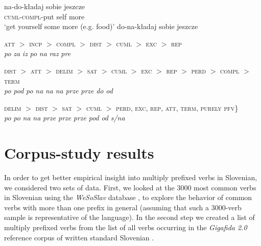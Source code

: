 \documentclass[output=paper,colorlinks,citecolor=brown]{langscibook}
\begin{document}
\ea \label{ex:wilandDoNaDo}
\ea \gll na-do-kładaj sobie jeszcze \\ 
\textsc{cuml}-\textsc{compl}-put self more\\ 
\glt ‘get yourself some more (e.g. food)’ \label{ex:wilandNaDo}
\ex *do-na-kładaj sobie jeszcze \label{ex:wilandDoNa} \hfill \citep[Polish;][]{wiland2012prefix}
\z \z 

\ea \gll \textsc{att} $>$ \textsc{incp} $>$ \textsc{compl} $>$ \textsc{dist} $>$ \textsc{cuml} $>$ \textsc{exc} $>$ \textsc{rep} \label{ex:istrakovaOrder} \\
\textit{po}  {} \textit{za} {} \textit{iz} {} \textit{po} {} \textit{na} {} \textit{raz} {} \textit{pre}\\
\glt \strut \hfill \citep[Bulgarian;][]{istratkova2006}
\z

 \ea 
\gll \textsc{dist} $>$ \textsc{att} $>$ \textsc{delim} $>$ \textsc{sat} $>$ \textsc{cuml} $>$ \textsc{exc} $>$ \textsc{rep} $>$ \textsc{perd} $>$ \textsc{compl} $>$ \textsc{term} \\
\textit{po}  {} \textit{pod} {} \textit{po} {} \textit{na} {} \textit{na} {} \textit{na} {} \textit{prze} {} \textit{prze} {} \textit{do} {} \textit{od} \\
\glt \strut \label{ex:wilandOrder} \hfill \citep[Polish;][]{wiland2012prefix}
 \z
 
\ea \gll \textsc{delim} $>$ \textsc{dist} $>$ \textsc{sat} $>$ \textsc{cuml} $>$ \minsp{\{} \textsc{perd}, \textsc{exc}, \textsc{rep}, \textsc{att}, \textsc{term}, \textsc{purely pfv}\}\\
\textit{po}  {} \textit{po} {} \textit{na} {} \textit{na} {} {} \textit{prze} \textit{prze} \textit{prze} \textit{pod} \textit{od} \textit{s/na} \\
\label{ex:klimekOrder} \hfill \citep[Polish;][]{KlimekJankowskaBlaszczak2022}
\z




\section{Corpus-study results}\label{sec:corpus}

In order to get better empirical insight into multiply prefixed verbs in Slovenian, we considered two sets of data. First, we looked at the 3000 most common verbs in Slovenian using the \textit{WeSoSlav} database \citep[see][]{mar+:WeSoSlaV}, to explore the behavior of common verbs with more than one prefix in general (assuming that such a 3000-verb sample is representative of the language). In the second step we created a list of multiply prefixed verbs from the list of all verbs occurring in the \textit{Gigafida 2.0} reference corpus of written standard Slovenian \citep{gigafida_glagoli}.
\end{document}
